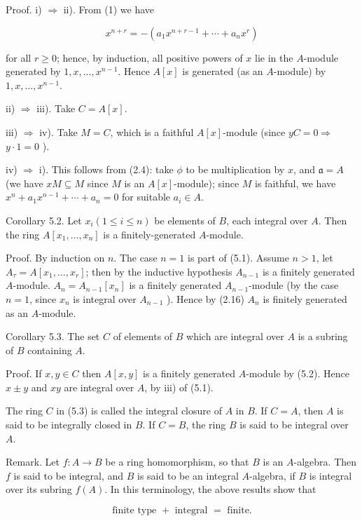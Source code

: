 \documentclass{standalone}
\theoremstyle{definition}
\theoremstyle{remark}
\begin{document}
Proof. i) $\Rightarrow$ ii). From (1) we have

\[
x^{n+r}=-\left(a_{1} x^{n+r-1}+\cdots+a_{n} x^{r}\right)
\]

for all $r \geqslant 0$; hence, by induction, all positive powers of $x$ lie in the $A$-module generated by $1, x, \ldots, x^{n-1}$. Hence $A[x]$ is generated (as an $A$-module) by $1, x, \ldots, x^{n-1}$.

ii) $\Rightarrow$ iii). Take $C=A[x]$.

iii) $\Rightarrow$ iv). Take $M=C$, which is a faithful $A[x]$-module (since $y C=0 \Rightarrow$ $y \cdot 1=0$ ).

iv) $\Rightarrow$ i). This follows from (2.4): take $\phi$ to be multiplication by $x$, and $\mathfrak{a}=A$ (we have $x M \subseteq M$ since $M$ is an $A[x]$-module); since $M$ is faithful, we have $x^{n}+a_{1} x^{n-1}+\cdots+a_{n}=0$ for suitable $a_{i} \in A$.

Corollary 5.2. Let $x_{i}(1 \leqslant i \leqslant n)$ be elements of $B$, each integral over $A$. Then the ring $A\left[x_{1}, \ldots, x_{n}\right]$ is a finitely-generated $A$-module.

Proof. By induction on $n$. The case $n=1$ is part of (5.1). Assume $n>1$, let $A_{\tau}=A\left[x_{1}, \ldots, x_{r}\right]$; then by the inductive hypothesis $A_{n-1}$ is a finitely generated $A$-module. $A_{n}=A_{n-1}\left[x_{n}\right]$ is a finitely generated $A_{n-1}$-module (by the case $n=1$, since $x_{n}$ is integral over $A_{n-1}$ ). Hence by (2.16) $A_{n}$ is finitely generated as an $A$-module.

Corollary 5.3. The set $C$ of elements of $B$ which are integral over $A$ is a subring of $B$ containing $A$.

Proof. If $x, y \in C$ then $A[x, y]$ is a finitely generated $A$-module by (5.2). Hence $x \pm y$ and $x y$ are integral over $A$, by iii) of (5.1).

The ring $C$ in (5.3) is called the integral closure of $A$ in $B$. If $C=A$, then $A$ is said to be integrally closed in $B$. If $C=B$, the ring $B$ is said to be integral over $A$.

Remark. Let $f: A \rightarrow B$ be a ring homomorphism, so that $B$ is an $A$-algebra. Then $f$ is said to be integral, and $B$ is said to be an integral $A$-algebra, if $B$ is integral over its subring $f(A)$. In this terminology, the above results show that

\[
\text { finite type }+ \text { integral }=\text { finite. }
\]
\end{document}
